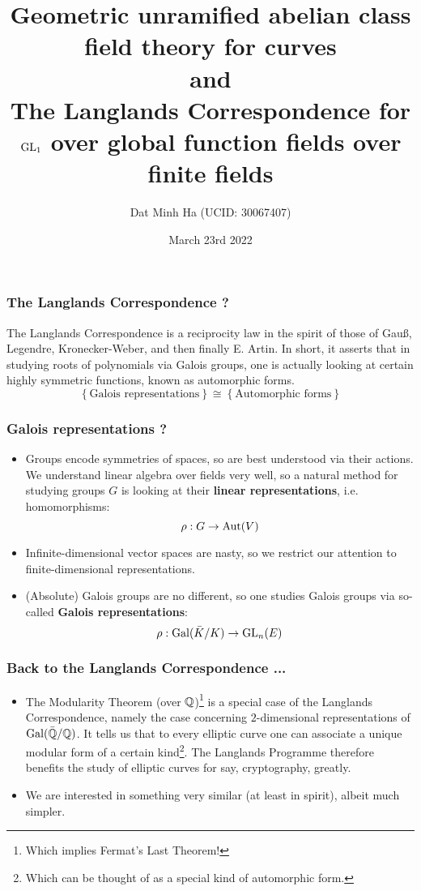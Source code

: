 \documentclass{beamer}
\title{Geometric unramified abelian class field theory for curves\\and\\The Langlands Correspondence for $\operatorname{GL}_1$ over global function fields over finite fields}
\author{Dat Minh Ha (UCID: 30067407)}
\institute{Department of Mathematics and Statistics\\University of Calgary}
\date{March 23rd 2022}
\begin{document}
    \frame{\titlepage}
    
    \begin{frame}
        \frametitle{The Langlands Correspondence ?}
        
        The Langlands Correspondence is a reciprocity law in the spirit of those of Gau{\ss}, Legendre, Kronecker-Weber, and then finally E. Artin. In short, it asserts that in studying roots of polynomials via Galois groups, one is actually looking at certain highly symmetric functions, known as automorphic forms.
        $$\left\{\text{Galois representations}\right\} \cong \left\{\text{Automorphic forms}\right\}$$
    \end{frame}
    
    \begin{frame}
        \frametitle{Galois representations ?}
        
        \begin{itemize}
            \item Groups encode symmetries of spaces, so are best understood via their actions. We understand linear algebra over fields very well, so a natural method for studying groups $G$ is looking at their \textbf{linear representations}, i.e. homomorphisms:
                $$\rho: G \to \mathrm{Aut}(V)$$
            \item Infinite-dimensional vector spaces are nasty, so we restrict our attention to finite-dimensional representations.
            \item (Absolute) Galois groups are no different, so one studies Galois groups via so-called \textbf{Galois representations}:
                $$\rho: \mathrm{Gal}(\bar{K}/K) \to \operatorname{GL}_n(E)$$
        \end{itemize}
    \end{frame}
    
    \begin{frame}
        \frametitle{Back to the Langlands Correspondence ...}
        
        \begin{itemize}
            \item The Modularity Theorem (over $\mathbb{Q}$)\footnote{Which implies Fermat's Last Theorem!} is a special case of the Langlands Correspondence, namely the case concerning $2$-dimensional representations of $\mathrm{Gal}(\bar{\mathbb{Q}}/\mathbb{Q})$. It tells us that to every elliptic curve one can associate a unique modular form of a certain kind\footnote{Which can be thought of as a special kind of automorphic form.}. The Langlands Programme therefore benefits the study of elliptic curves for say, cryptography, greatly.
            \item We are interested in something very similar (at least in spirit), albeit much simpler.
        \end{itemize}
    \end{frame}
    
\end{document}
